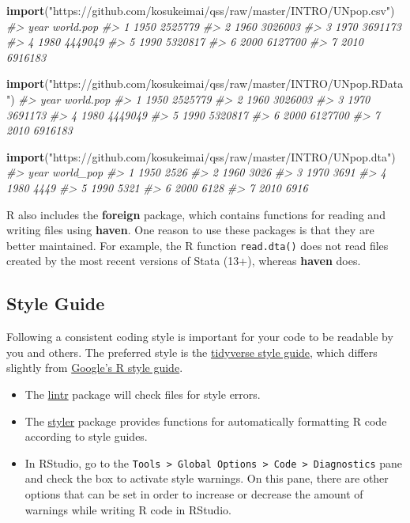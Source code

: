 \documentclass[]{book}
\newenvironment{Shaded}{\begin{snugshade}}{\end{snugshade}}
\newcommand{\KeywordTok}[1]{\textcolor[rgb]{0.13,0.29,0.53}{\textbf{#1}}}
\newcommand{\StringTok}[1]{\textcolor[rgb]{0.31,0.60,0.02}{#1}}
\newcommand{\CommentTok}[1]{\textcolor[rgb]{0.56,0.35,0.01}{\textit{#1}}}
\newcommand{\NormalTok}[1]{#1}
\theoremstyle{definition}
\theoremstyle{definition}
\theoremstyle{definition}
\theoremstyle{remark}
\begin{document}
\begin{Shaded}
\begin{Highlighting}[]
\KeywordTok{import}\NormalTok{(}\StringTok{"https://github.com/kosukeimai/qss/raw/master/INTRO/UNpop.csv"}\NormalTok{)}
\CommentTok{#>   year world.pop}
\CommentTok{#> 1 1950   2525779}
\CommentTok{#> 2 1960   3026003}
\CommentTok{#> 3 1970   3691173}
\CommentTok{#> 4 1980   4449049}
\CommentTok{#> 5 1990   5320817}
\CommentTok{#> 6 2000   6127700}
\CommentTok{#> 7 2010   6916183}

\KeywordTok{import}\NormalTok{(}\StringTok{"https://github.com/kosukeimai/qss/raw/master/INTRO/UNpop.RData"}\NormalTok{)}
\CommentTok{#>   year world.pop}
\CommentTok{#> 1 1950   2525779}
\CommentTok{#> 2 1960   3026003}
\CommentTok{#> 3 1970   3691173}
\CommentTok{#> 4 1980   4449049}
\CommentTok{#> 5 1990   5320817}
\CommentTok{#> 6 2000   6127700}
\CommentTok{#> 7 2010   6916183}

\KeywordTok{import}\NormalTok{(}\StringTok{"https://github.com/kosukeimai/qss/raw/master/INTRO/UNpop.dta"}\NormalTok{)}
\CommentTok{#>   year world_pop}
\CommentTok{#> 1 1950      2526}
\CommentTok{#> 2 1960      3026}
\CommentTok{#> 3 1970      3691}
\CommentTok{#> 4 1980      4449}
\CommentTok{#> 5 1990      5321}
\CommentTok{#> 6 2000      6128}
\CommentTok{#> 7 2010      6916}
\end{Highlighting}
\end{Shaded}

R also includes the \textbf{foreign} package, which contains functions
for reading and writing files using \textbf{haven}. One reason to use
these packages is that they are better maintained. For example, the R
function \texttt{read.dta()} does not read files created by the most
recent versions of Stata (13+), whereas \textbf{haven} does.

\subsection{Style Guide}\label{style-guide}

Following a consistent coding style is important for your code to be
readable by you and others. The preferred style is the
\href{http://style.tidyverse.org/}{tidyverse style guide}, which differs
slightly from \href{http://style.tidyverse.org/}{Google's R style
guide}.

\begin{itemize}
\item
  The \href{https://cran.r-project.org/package=lintr}{lintr} package
  will check files for style errors.
\item
  The \href{https://cran.r-project.org/package=styler}{styler} package
  provides functions for automatically formatting R code according to
  style guides.
\item
  In RStudio, go to the
  \texttt{Tools\ \textgreater{}\ Global\ Options\ \textgreater{}\ Code\ \textgreater{}\ Diagnostics}
  pane and check the box to activate style warnings. On this pane, there
  are other options that can be set in order to increase or decrease the
  amount of warnings while writing R code in RStudio.
\end{itemize}
\end{document}
